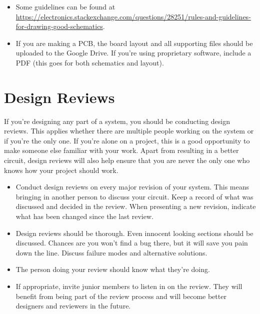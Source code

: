 \documentclass{article}
\begin{document}
\begin{enumerate}
\begin{itemize}
\item Some guidelines can be found at \url{https://electronics.stackexchange.com/questions/28251/rules-and-guidelines-for-drawing-good-schematics}.
\item If you are making a PCB, the board layout and all supporting files should be uploaded to the Google Drive. If you're using proprietary software, include a PDF (this goes for both schematics and layout).
\end{itemize}
\end{enumerate}

\section{Design Reviews}
If you're designing any part of a system, you should be conducting design reviews. This applies whether there are multiple people working on the system or if you're the only one. If you're alone on a project, this is a good opportunity to make someone else familiar with your work. Apart from resulting in a better circuit, design reviews will also help ensure that you are never the only one who knows how your project should work.
\begin{itemize}
\item  Conduct design reviews on every major revision of your system. This means bringing in another person to discuss your circuit. Keep a record of what was discussed and decided in the review. When presenting a new revision, indicate what has been changed since the last review.
\item Design reviews should be thorough. Even innocent looking sections should be discussed. Chances are you won't find a bug there, but it will save you pain down the line. Discuss failure modes and alternative solutions.
\item The person doing your review should know what they're doing.
\item If appropriate, invite junior members to listen in on the review. They will benefit from being part of the review process and will become better designers and reviewers in the future.
\end{itemize}
\end{document}
